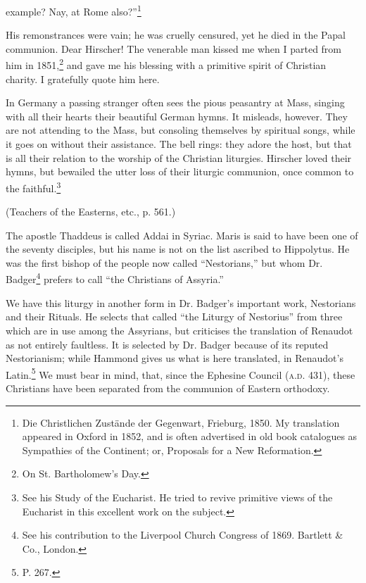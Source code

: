 example? Nay, at Rome also?”\footnote{\par  Die Christlichen Zustände der Gegenwart, Frieburg, 1850. My translation appeared in Oxford in 1852, and is often advertised in old book catalogues as Sympathies of the Continent; or, Proposals for a New Reformation.}

His remonstrances were vain; he was cruelly censured, yet he died in the Papal communion. Dear Hirscher! The venerable man kissed me when I parted from him in 1851,\footnote{\par  On St. Bartholomew’s Day.} and gave me his blessing with a primitive spirit of Christian charity. I gratefully quote him here.

In Germany a passing stranger often sees the pious peasantry at Mass, singing with all their hearts their beautiful German hymns. It misleads, however. They are not attending to the Mass, but consoling themselves by spiritual songs, while it goes on without their assistance. The bell rings: they adore the host, but that is all their relation to the worship of the Christian liturgies. Hirscher loved their hymns, but bewailed the utter loss of their liturgic communion, once common to the faithful.\footnote{\par  See his Study of the Eucharist. He tried to revive primitive views of the Eucharist in this excellent work on the subject.}

(Teachers of the Easterns, etc., p. 561.)

The apostle Thaddeus is called Addai in Syriac. Maris is said to have been one of the seventy disciples, but his name is not on the list ascribed to Hippolytus. He was the first bishop of the people now called “Nestorians,” but whom Dr. Badger\footnote{\par  See his contribution to the Liverpool Church Congress of 1869. Bartlett \& Co., London.} prefers to call “the Christians of Assyria.”

We have this liturgy in another form in Dr. Badger’s important work, Nestorians and their Rituals. He selects that called “the Liturgy of Nestorius” from three which are in use among the Assyrians, but criticises the translation of Renaudot as not entirely faultless. It is selected by Dr. Badger because of its reputed Nestorianism; while Hammond gives us what is here translated, in Renaudot’s Latin.\footnote{\par  P. 267.} We must bear in mind, that, since the Ephesine Council (\textsc{a.d.} 431), these Christians have been separated from the communion of Eastern orthodoxy.

